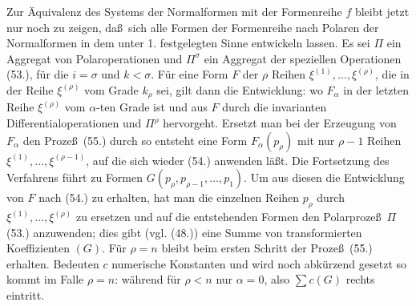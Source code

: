 Zur \"Aquivalenz des Systems der Normalformen mit der Formenreihe $f$ bleibt jetzt nur noch zu zeigen, da\ss\ sich alle Formen der Formenreihe nach Polaren der Normalformen in dem unter 1. festgelegten Sinne entwickeln lassen. Es sei $\Pi$ ein Aggregat von Polaroperationen
und $\Pi^\sigma$ ein Aggregat der speziellen Operationen (53.), f\"ur die $i=\sigma$ und $k<\sigma$. F\"ur eine Form $F$ der $\rho$ Reihen $\xi^{(1)},\ldots,\xi^{(\rho)}$, die in der Reihe $\xi^{(\rho)}$ vom Grade $k_\rho$ sei, gilt dann die Entwicklung:
wo $F_\alpha$ in der letzten Reihe $\xi^{(\rho)}$ vom $\alpha$-ten Grade ist und aus $F$ durch die invarianten Differentialoperationen
und $\Pi^\rho$ hervorgeht. Ersetzt man bei der Erzeugung von $F_\alpha$ den Proze\ss\ (55.) durch
so entsteht eine Form $F_\alpha(p_\rho)$ mit nur $\rho-1$ Reihen $\xi^{(1)},\ldots,\xi^{(\rho-1)}$, auf die sich wieder (54.) anwenden l\"a\ss t. Die Fortsetzung des Verfahrens f\"uhrt zu Formen $G(p_\rho,p_{\rho-1},\ldots,p_1)$. Um aus diesen die Entwicklung von $F$ nach (54.) zu erhalten, hat man die einzelnen Reihen $p_\rho$ durch $\xi^{(1)},\ldots,\xi^{(\rho)}$ zu ersetzen und auf die entstehenden Formen den Polarproze\ss\ $\Pi$ (53.) anzuwenden; dies gibt (vgl. (48.)) eine Summe von transformierten Koeffizienten $(G)$. F\"ur $\rho=n$ bleibt beim ersten Schritt der Proze\ss\ (55.) erhalten. Bedeuten $c$ numerische Konstanten und wird noch abk\"urzend gesetzt
so kommt im Falle $\rho=n$:
w\"ahrend f\"ur $\rho<n$ nur $\alpha=0$, also $\sum c(G)$ rechts eintritt.

